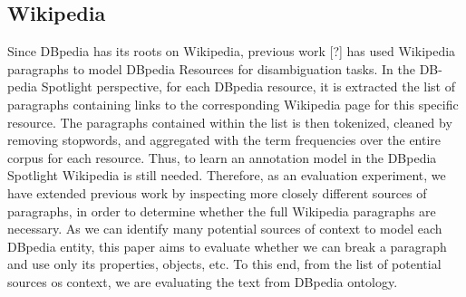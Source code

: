 \documentclass[10pt,a4paper]{article}
\begin{document}





\subsection{Wikipedia}

Since DBpedia has its roots on Wikipedia, previous work [?] has used Wikipedia paragraphs to model DBpedia Resources for disambiguation tasks. In the DB- pedia Spotlight perspective, for each DBpedia resource, it is extracted the list of paragraphs containing links to the corresponding Wikipedia page for this specific resource. The paragraphs contained within the list is then tokenized, cleaned by removing stopwords, and aggregated with the term frequencies over the entire corpus for each resource. Thus, to learn an annotation model in the DBpedia Spotlight Wikipedia is still needed.
Therefore, as an evaluation experiment, we have extended previous work by inspecting more closely different sources of paragraphs, in order to determine whether the full Wikipedia paragraphs are necessary. As we can identify many potential sources of context to model each DBpedia entity, this paper aims to evaluate whether we can break a paragraph and use only its properties, objects, etc. To this end, from the list of potential sources os context, we are evaluating the text from DBpedia ontology.
\end{document}
